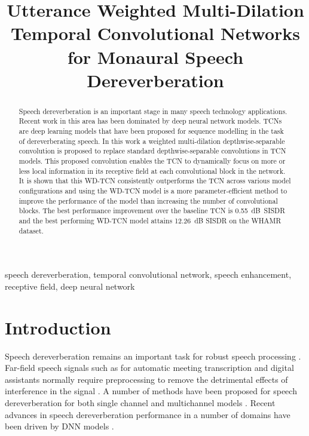 \documentclass{article}
\title{Utterance Weighted Multi-Dilation Temporal Convolutional Networks for Monaural Speech Dereverberation}
\begin{document}
\ninept
\maketitle


\begin{abstract}

Speech dereverberation is an important stage in many speech technology applications. Recent work in this area has been dominated by deep neural network models. \Acp{TCN} are 
deep learning models that have been proposed for sequence modelling in the task of dereverberating speech. 
In this work a weighted multi-dilation depthwise-separable convolution is proposed to replace standard depthwise-separable convolutions in \ac{TCN} models. This proposed convolution enables the \ac{TCN} to 
dynamically focus on more or less local information in its receptive field at each convolutional block in the network. It is shown that this \ac{WD-TCN} consistently outperforms the \ac{TCN} across various model configurations and using the \ac{WD-TCN} model is a more parameter-efficient method to improve the performance of the model than increasing the number of convolutional blocks. The best performance improvement over the baseline \ac{TCN} is 0.55~dB~\ac{SISDR} and the best performing \ac{WD-TCN} model attains 12.26~dB SISDR on the WHAMR dataset.

\end{abstract}
\begin{keywords}
speech dereverberation, temporal convolutional network, speech enhancement, receptive field, deep neural network
\end{keywords}
\section{Introduction}
\label{sec:intro}
Speech dereverberation remains an important task for robust speech processing \cite{FFASRHaebUmbach,XMM+15,Purushothaman2020}. Far-field speech signals such as for automatic meeting transcription and digital assistants normally require preprocessing to remove the detrimental effects of interference in the signal \cite{Haeb-Umbach2019, Hain3,close2022}. A number of methods have been proposed for speech dereverberation for both single channel and multichannel models \cite{Habets2010}. Recent advances in speech dereverberation performance in a number of domains have been driven by \ac{DNN} models \cite{dnnwpe,8553141,Wang2020DeepLB,Wang2021TeCANetTA,Zhao2021UNetBasedMS}.
\end{document}
